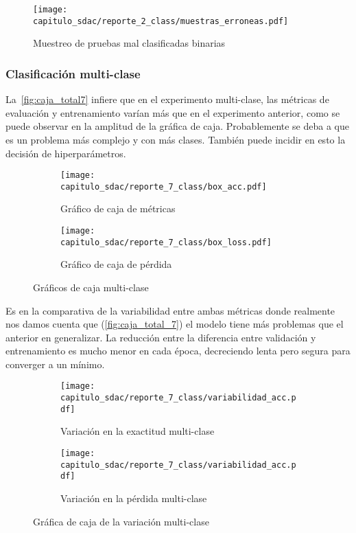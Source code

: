 \begin{figure}[H]
    \centering
    \texttt{[image: capitulo\_sdac/reporte\_2\_class/muestras\_erroneas.pdf]}
    \caption{Muestreo de pruebas mal clasificadas binarias}\label{fig:muestreo_error_2}
\end{figure}


\subsubsection{Clasificación multi-clase}

La~\autoref{fig:caja_total7} infiere que en el experimento multi-clase, las
métricas de evaluación y entrenamiento varían más que en el experimento
anterior, como se puede observar en la amplitud de la gráfica de caja.
Probablemente se deba a que es un problema más complejo y con más clases.
También puede incidir en esto la decisión de hiperparámetros.

\begin{figure}[H]
    \centering
    \begin{subfigure}[b]{0.6\textwidth}
        \centering
        \texttt{[image: capitulo\_sdac/reporte\_7\_class/box\_acc.pdf]}
        \caption{Gráfico de caja de métricas}\label{fig:caja_acc7} 
    \end{subfigure}

    \begin{subfigure}[b]{0.6\textwidth}
        \centering
        \texttt{[image: capitulo\_sdac/reporte\_7\_class/box\_loss.pdf]}
        \caption{Gráfico de caja de pérdida}\label{fig:caja_loss7}
    \end{subfigure}
    \caption{Gráficos de caja multi-clase}\label{fig:caja_total7}
\end{figure}


Es en la comparativa de la variabilidad entre ambas métricas donde realmente nos
damos cuenta que (\autoref{fig:caja_total_7}) el modelo tiene más problemas que
el anterior en generalizar. La reducción entre la diferencia entre validación y
entrenamiento es mucho menor en cada época, decreciendo lenta pero segura para
converger a un mínimo.

\begin{figure}[H]
    \centering
    \begin{subfigure}[b]{0.6\textwidth}
        \centering
        \texttt{[image: capitulo\_sdac/reporte\_7\_class/variabilidad\_acc.pdf]}
        \caption{Variación en la exactitud multi-clase}\label{fig:caja_acc_7} 
    \end{subfigure}

    \begin{subfigure}[b]{0.6\textwidth}
        \centering
        \texttt{[image: capitulo\_sdac/reporte\_7\_class/variabilidad\_acc.pdf]}
        \caption{Variación en la pérdida multi-clase}\label{fig:caja_loss_7}
    \end{subfigure}
    \caption{Gráfica de caja de la variación multi-clase}\label{fig:caja_total_7}
\end{figure}

